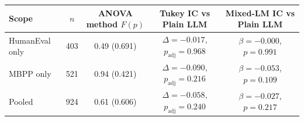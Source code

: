 \begin{tabular}{@{}lcccc@{}}
\toprule
Scope & $n$ & ANOVA method $F(p)$ & Tukey IC vs Plain LLM & Mixed-LM IC vs Plain LLM \\
\midrule
HumanEval only & 403 & 0.49 (0.691) & $\Delta=-0.017$, \newline $p_{\mathrm{adj}}=0.968$ & $\beta=-0.000$, \newline $p=0.991$ \\
MBPP only & 521 & 0.94 (0.421) & $\Delta=-0.090$, \newline $p_{\mathrm{adj}}=0.216$ & $\beta=-0.053$, \newline $p=0.109$ \\
Pooled & 924 & 0.61 (0.606) & $\Delta=-0.058$, \newline $p_{\mathrm{adj}}=0.240$ & $\beta=-0.027$, \newline $p=0.217$ \\
\bottomrule
\end{tabular}

